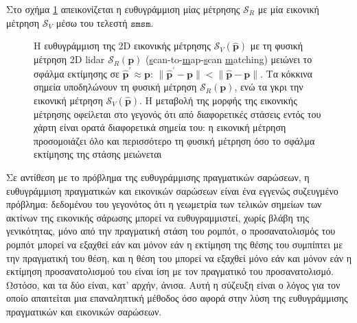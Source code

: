 Στο σχήμα \ref{fig:smsm_principle} απεικονίζεται η ευθυγράμμιση μίας μέτρησης
$\mathcal{S}_R$ με μία εικονική μέτρηση $\mathcal{S}_V$ μέσω του τελεστή
$\texttt{smsm}$.


\begin{figure}[htbp]\centering
  
  \vspace{0.5cm}
  \caption{\small Η ευθυγράμμιση της 2D εικονικής μέτρησης $\mathcal{S}_V(\hat{\bm{p}})$ με
           τη φυσική μέτρηση 2D lidar $\mathcal{S}_R(\bm{p})$
           (\underline{s}can-to-\underline{m}ap-\underline{s}can
           \underline{m}atching) μειώνει το σφάλμα εκτίμησης σε
           $\hat{\bm{p}}^\prime \approx \bm{p}$:
           $\|\hat{\bm{p}}^\prime - \bm{p}\| < \|\hat{\bm{p}}- \bm{p}\|$. Τα
           κόκκινα σημεία υποδηλώνουν τη φυσική μέτρηση $\mathcal{S}_R(\bm{p})$,
           ενώ τα γκρι την εικονική μέτρηση $\mathcal{S}_V(\hat{\bm{p}})$.
           Η μεταβολή της μορφής της εικονικής μέτρησης οφείλεται στο γεγονός
           ότι από διαφορετικές στάσεις εντός του χάρτη είναι ορατά διαφορετικά
           σημεία του: η εικονική μέτρηση προσομοιάζει όλο και περισσότερο
           τη φυσική μέτρηση όσο το σφάλμα εκτίμησης της στάσης μειώνεται}
  \label{fig:smsm_principle}
\end{figure}

\begin{gg_box}
\begin{remark}
\label{rem:iterative}
Σε αντίθεση με το πρόβλημα της ευθυγράμμισης πραγματικών σαρώσεων, η
ευθυγράμμιση πραγματικών και εικονικών σαρώσεων είναι ένα εγγενώς συζευγμένο
πρόβλημα: δεδομένου του γεγονότος ότι η γεωμετρία των τελικών σημείων των
ακτίνων της εικονικής σάρωσης μπορεί να ευθυγραμμιστεί, χωρίς βλάβη της
γενικότητας, μόνο από την πραγματική στάση του ρομπότ, ο προσανατολισμός του
ρομπότ μπορεί να εξαχθεί εάν και μόνον εάν η εκτίμηση της θέσης του συμπίπτει
με την πραγματική του θέση, και η θέση του μπορεί να εξαχθεί μόνο εάν και
μόνον εάν η εκτίμηση προσανατολισμού του είναι ίση με τον πραγματικό του
προσανατολισμό. Ωστόσο, και τα δύο είναι, κατ' αρχήν, άνισα. Αυτή η σύζευξη
είναι ο λόγος για τον οποίο απαιτείται μια επαναληπτική μέθοδος όσο αφορά
στην λύση της ευθυγράμμισης πραγματικών και εικονικών σαρώσεων.
\end{remark}
\end{gg_box}

